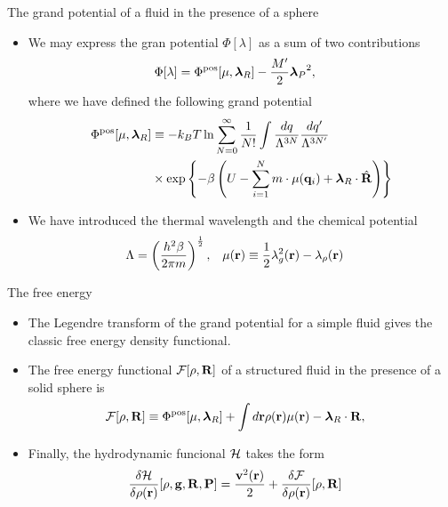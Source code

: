 \documentclass{beamer}
\begin{document}
\begin{frame}{The grand potential of a fluid in the presence of a sphere}
  \begin{itemize}
    \item 
  We may express the gran potential $\Phi [\lambda]$ as a sum of two contributions
\begin{align}
\Phi [\lambda]&=  \Phi^{\rm pos}[\mu,\boldsymbol{\lambda}_R]
-\frac{M'}{2} {\boldsymbol{\lambda}_P}^2,
\nonumber
\end{align}
where we have defined the following grand potential
\begin{align}
\Phi^{\rm pos}[\mu,\boldsymbol{\lambda}_R]
&\equiv-k_BT\ln
 \sum_{N=0}^\infty \frac{1}{N!}
\int \frac{dq}{\Lambda^{3N}}\frac{dq'}{\Lambda^{3N'}}\nonumber\\
&\times
\exp\left\{-\beta  \left(U-\sum_{i=1}^N m\cdot\mu({\bf
    q}_i)+ \boldsymbol{\lambda}_R\cdot\hat{\bf R}\right)\right\}
\nonumber
\end{align}
\item We have introduced the thermal wavelength  and the chemical potential
\begin{align}
  \Lambda=\left(\frac{h^2\beta}{2\pi m}\right)^{\frac{1}{2}}, &&
  \mu({\bf r})&\equiv\frac{1}{2}\lambda_g^2({\bf r})-\lambda_\rho({\bf r})
\nonumber
\end{align}
\end{itemize}
\end{frame}

\begin{frame}{The free energy}
  \begin{itemize}
    \item The Legendre transform of the grand potential for a simple fluid gives the classic free energy density functional.
    \item The free energy functional ${\cal  F}[\rho,{\bf R}]$ of a structured fluid in the presence of a solid sphere is
\begin{align}
  {\cal F}[\rho,{\bf R}]&\equiv  \Phi^{\rm pos}[\mu,\boldsymbol{\lambda}_R]
+
\int d{\bf r}\rho({\bf r})\mu({\bf r})-\boldsymbol{\lambda}_R\cdot{\bf R},
\nonumber
\end{align}
\item Finally, the hydrodynamic funcional ${\cal H}$ takes the form
\begin{align}
  \frac{\delta {\cal H}}{\delta\rho({\bf r})}[\rho,{\bf g},{\bf R},{\bf P}] &=    
\frac{{\bf v}^2({\bf r})}{2}+  \frac{\delta {\cal F}}{\delta\rho({\bf r})}[\rho,{\bf R}]
\nonumber
\end{align}
\end{itemize}
\end{frame}
\end{document}
